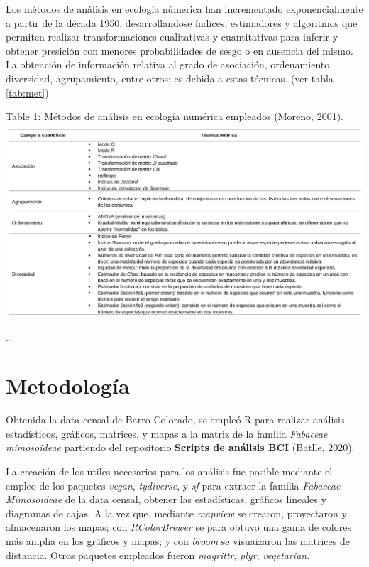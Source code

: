 \documentclass[11pt,]{article}
\begin{document}
Los métodos de análisis en ecología númerica han incrementado
exponencialmente a partir de la década 1950, desarrollandose índices,
estimadores y algoritmos que permiten realizar transformaciones
cualitativas y cuantitativas para inferir y obtener presición con
menores probabilidades de sesgo o en ausencia del mismo. La obtención de
información relativa al grado de asociación, ordenamiento, diversidad,
agrupamiento, entre otros; es debida a estas técnicas. (ver tabla
\ref {tab:met})

Table 1: Métodos de análisis en ecología numérica empleados (Moreno,
2001).\label{tab:met}
\includegraphics[width=1.00000\textwidth]{Análisis/Diversidad/Tabla_Métodos_Análisis.png}

\ldots

\section{Metodología}\label{metodologuxeda}

Obtenida la data censal de Barro Colorado, se empleó R para realizar
análisis estadísticos, gráficos, matrices, y mapas a la matriz de la
familia \emph{Fabaceae mimosoideae} partiendo del repositorio
\textbf{Scripts de análisis BCI} (Batlle, 2020).

La creación de los utiles necesarios para los análisis fue posible
mediante el empleo de los paquetes \emph{vegan}, \emph{tydiverse}, y
\emph{sf} para extraer la familia \emph{Fabaceae Mimosoideae} de la data
censal, obtener las estadísticas, gráficos lineales y diagramas de
cajas. A la vez que, mediante \emph{mapview} se crearon, proyectaron y
almacenaron los mapas; con \emph{RColorBrewer} se para obtuvo una gama
de colores más amplia en los gráficos y mapas; y con \emph{broom} se
visuaizaron las matrices de distancia. Otros paquetes empleados fueron
\emph{magrittr}, \emph{plyr}, \emph{vegetarian}.
\end{document}
